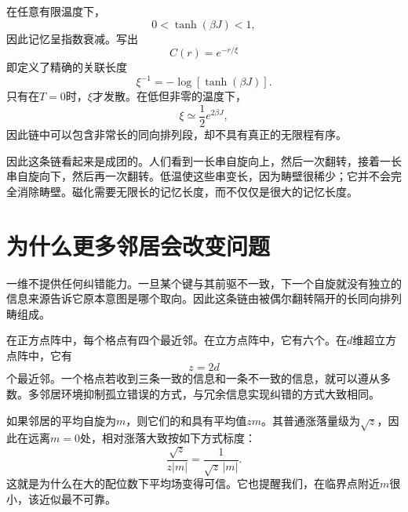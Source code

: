 \begin{classroomqa}
\end{classroomqa}

在任意有限温度下，
\begin{equation}
0<\tanh(\beta J)<1,
\end{equation}
因此记忆呈指数衰减。写出
\begin{equation}
C(r)=e^{-r/\xi}
\end{equation}
即定义了精确的关联长度
\begin{equation}
\xi^{-1}=-\log\!\left[\tanh(\beta J)\right].
\label{eq:correlation-length}
\end{equation}
只有在\(T=0\)时，\(\xi\)才发散。在低但非零的温度下，
\begin{equation}
\xi\simeq \frac{1}{2}e^{2\beta J},
\end{equation}
因此链中可以包含非常长的同向排列段，却不具有真正的无限程有序。

因此这条链看起来是成团的。人们看到一长串自旋向上，然后一次翻转，接着一长串自旋向下，然后再一次翻转。低温使这些串变长，因为畴壁很稀少；它并不会完全消除畴壁。磁化需要无限长的记忆长度，而不仅仅是很大的记忆长度。

\section{为什么更多邻居会改变问题}

一维不提供任何纠错能力。一旦某个键与其前驱不一致，下一个自旋就没有独立的信息来源告诉它原本意图是哪个取向。因此这条链由被偶尔翻转隔开的长同向排列畴组成。

在正方点阵中，每个格点有四个最近邻。在立方点阵中，它有六个。在\(d\)维超立方点阵中，它有
\begin{equation}
z=2d
\end{equation}
个最近邻。一个格点若收到三条一致的信息和一条不一致的信息，就可以遵从多数。多邻居环境抑制孤立错误的方式，与冗余信息实现纠错的方式大致相同。

如果邻居的平均自旋为\(m\)，则它们的和具有平均值\(zm\)。其普通涨落量级为\(\sqrt{z}\)，因此在远离\(m=0\)处，相对涨落大致按如下方式标度：
\begin{equation}
\frac{\sqrt{z}}{z|m|}
=\frac{1}{\sqrt{z}\,|m|}.
\end{equation}
这就是为什么在大的配位数下平均场变得可信。它也提醒我们，在临界点附近\(m\)很小，该近似最不可靠。

